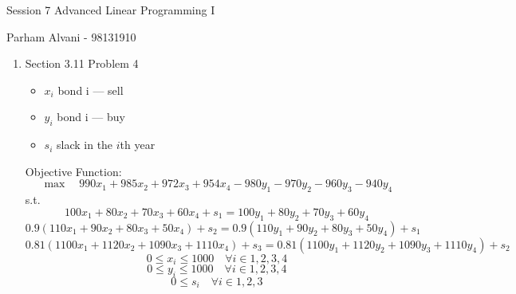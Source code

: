 \documentclass{article}
\begin{document}
\large %


{\Large Session 7 %
\hfill  Advanced Linear Programming I}

\begin{center}
{\Large Parham Alvani - 98131910} %
\end{center}
\vspace{0.05in}


\begin{enumerate}

\item Section 3.11 Problem 4
\begin{itemize}
\item \(x_i\) bond i --- sell
\item \(y_i\) bond i --- buy
\item \(s_i\) slack in the \(i\)th year
\end{itemize}
\par
Objective Function:
\[
    \max\quad990 x_1 + 985 x_2 + 972 x_3 + 954 x_4 - 980 y_1 - 970 y_2 - 960 y_3 - 940 y_4
\]
s.t.
\[
    100 x_1 + 80 x_2 + 70 x_3 + 60 x_4 + s_1 = 100 y_1 + 80 y_2 + 70 y_3 + 60 y_4
\]
\[
    0.9 (110 x_1 + 90 x_2 + 80 x_3 + 50 x_4) + s_2 = 0.9 (110 y_1 + 90 y_2 + 80 y_3 + 50 y_4) + s_1
\]
\[
    0.81 (1100 x_1 + 1120 x_2 + 1090 x_3 + 1110 x_4) + s_3 = 0.81 (1100 y_1 + 1120 y_2 + 1090 y_3 + 1110 y_4) + s_2
\]
\[
    0 \le x_i \le 1000 \quad \forall i \in {1,2,3,4}
\]
\[
    0 \le y_i \le 1000 \quad \forall i \in {1,2,3,4}
\]
\[
    0 \le s_i \quad \forall i \in {1,2,3}
\]

\end{enumerate}

\end{document}
